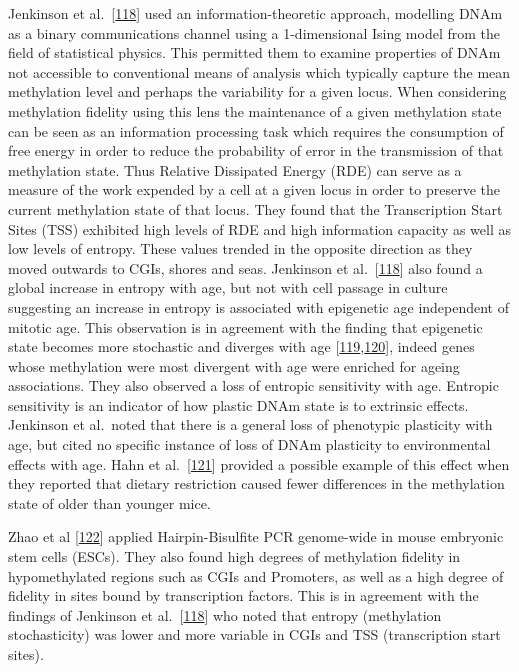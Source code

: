 \documentclass[
]{book}
\begin{document}
Jenkinson et al.~{[}\protect\hyperlink{ref-Jenkinson2017}{118}{]} used an information-theoretic approach, modelling DNAm as a binary communications channel using a 1-dimensional Ising model from the field of statistical physics.
This permitted them to examine properties of DNAm not accessible to conventional means of analysis which typically capture the mean methylation level and perhaps the variability for a given locus.
When considering methylation fidelity using this lens the maintenance of a given methylation state can be seen as an information processing task which requires the consumption of free energy in order to reduce the probability of error in the transmission of that methylation state.
Thus Relative Dissipated Energy (RDE) can serve as a measure of the work expended by a cell at a given locus in order to preserve the current methylation state of that locus.
They found that the Transcription Start Sites (TSS) exhibited high levels of RDE and high information capacity as well as low levels of entropy.
These values trended in the opposite direction as they moved outwards to CGIs, shores and seas.
Jenkinson et al.~{[}\protect\hyperlink{ref-Jenkinson2017}{118}{]} also found a global increase in entropy with age, but not with cell passage in culture suggesting an increase in entropy is associated with epigenetic age independent of mitotic age.
This observation is in agreement with the finding that epigenetic state becomes more stochastic and diverges with age {[}\protect\hyperlink{ref-Fraga2005}{119},\protect\hyperlink{ref-Slieker2016}{120}{]}, indeed genes whose methylation were most divergent with age were enriched for ageing associations.
They also observed a loss of entropic sensitivity with age.
Entropic sensitivity is an indicator of how plastic DNAm state is to extrinsic effects.
Jenkinson et al.~noted that there is a general loss of phenotypic plasticity with age, but cited no specific instance of loss of DNAm plasticity to environmental effects with age.
Hahn et al.~{[}\protect\hyperlink{ref-Hahn2017}{121}{]} provided a possible example of this effect when they reported that dietary restriction caused fewer differences in the methylation state of older than younger mice.

Zhao et al {[}\protect\hyperlink{ref-Zhao2014}{122}{]} applied Hairpin-Bisulfite PCR genome-wide in mouse embryonic stem cells (ESCs).
They also found high degrees of methylation fidelity in hypomethylated regions such as CGIs and Promoters, as well as a high degree of fidelity in sites bound by transcription factors.
This is in agreement with the findings of Jenkinson et al.~{[}\protect\hyperlink{ref-Jenkinson2017}{118}{]} who noted that entropy (methylation stochasticity) was lower and more variable in CGIs and TSS (transcription start sites).
\end{document}
